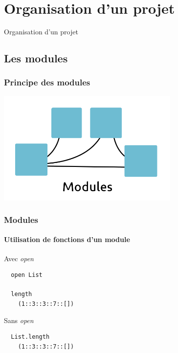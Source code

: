 \section{Organisation d'un projet}

\begin{frame}
	\begin{center}
		\huge
		Organisation d'un projet
	\end{center}
\end{frame}

\subsection{Les modules} %
\begin{frame}
	\frametitle{Principe des modules}
	\begin{center}
		\includegraphics[width=9cm]{pics/modules.png}
	\end{center}
\end{frame}

\begin{frame}[fragile]
	\frametitle{Modules}
	\framesubtitle{Utilisation de fonctions d'un module}
	\begin{block}{Avec \textit{open}}
		\begin{lstlisting}
  open List

  length
    (1::3::3::7::[])
		\end{lstlisting}
	\end{block}
	\begin{block}{Sans \textit{open}}
		\begin{lstlisting}
  List.length
    (1::3::3::7::[])
		\end{lstlisting}
	\end{block}
\end{frame}


